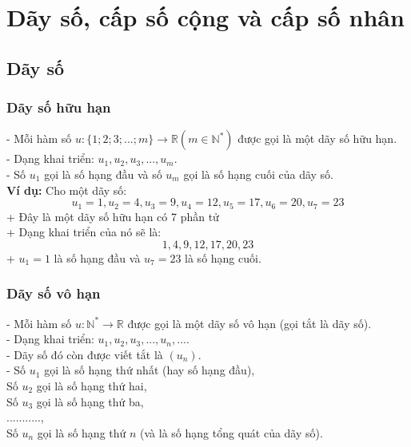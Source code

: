 \chapter{Dãy số, cấp số cộng và cấp số nhân}

\section{Dãy số}

\subsection{Dãy số hữu hạn}
\noindent\hspace*{1cm}- Mỗi hàm số $u:\{1;2;3;...;m\} \rightarrow \mathbb{R}(m \in \mathbb{N}^*)$ được gọi là một dãy số hữu hạn.\\[6pt]
\noindent\hspace*{1cm}- Dạng khai triển: $u_1, u_2, u_3,..., u_m$.\\[6pt]
\noindent\hspace*{1cm}- Số $u_1$ gọi là số hạng đầu và số $u_m$ gọi là số hạng cuối của dãy số.\\[20pt]
\noindent\textbf{Ví dụ:} Cho một dãy số:
\[
    u_1 = 1,
    u_2 = 4,
    u_3 = 9,
    u_4 = 12,
    u_5 = 17,
    u_6 = 20,
    u_7 = 23
\]
\noindent\hspace*{1.5cm}+ Đây là một dãy số hữu hạn có 7 phần tử\\[6pt]
\noindent\hspace*{1.5cm}+ Dạng khai triển của nó sẽ là:
\[
    1, 4, 9, 12, 17, 20, 23
\]
\noindent\hspace*{1.5cm}+ $u_1 = 1$ là số hạng đầu và $u_7 = 23$  là số hạng cuối.

\subsection{Dãy số vô hạn}
\noindent\hspace*{1cm}- Mỗi hàm số $u: \mathbb{N}^* \rightarrow \mathbb{R}$ được gọi là một dãy số vô hạn (gọi tắt là dãy số).\\[6pt]
\noindent\hspace*{1cm}- Dạng khai triển: $u_1, u_2, u_3,..., u_n,...$.\\[6pt]
\noindent\hspace*{1cm}- Dãy số đó còn được viết tắt là $(u_n)$.\\[6pt]
\noindent\hspace*{1cm}- Số $u_1$ gọi là số hạng thứ nhất (hay số hạng đầu),\\[6pt]
\noindent\hspace*{1.15cm} Số $u_2$ gọi là số hạng thứ hai,\\[6pt]
\noindent\hspace*{1.15cm} Số $u_3$ gọi là số hạng thứ ba,\\[6pt]
\noindent\hspace*{1.15cm} ...........,\\[6pt]
\noindent\hspace*{1.15cm} Số $u_n$ gọi là số hạng thứ $n$ (và là số hạng tổng quát của dãy số).\\[6pt]

